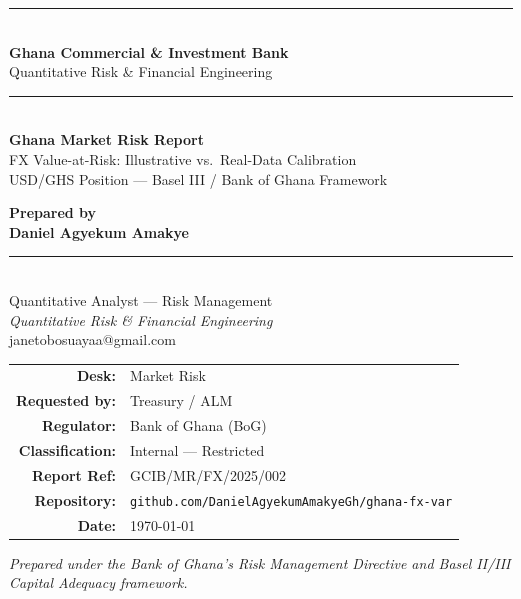 \documentclass[11pt,a4paper]{article}
\makeatletter
\newcommand{\authorname}{Daniel Agyekum Amakye}
\newcommand{\authortitle}{Quantitative Analyst --- Risk Management}
\newcommand{\authordesk}{Quantitative Risk \& Financial Engineering}
\newcommand{\authoremail}{janetobosuayaa@gmail.com}
\newcommand{\reporef}{github.com/DanielAgyekumAmakyeGh/ghana-fx-var}
\makeatother
\begin{document}
\begin{titlepage}
    \centering
    \vspace*{1.2cm}
    {\color{gcibblue}\rule{\textwidth}{1.5pt}}\\[0.4cm]
    {\Huge\bfseries\color{gcibblue} Ghana Commercial \& Investment Bank}\\[0.3cm]
    {\Large\color{gcibgold} Quantitative Risk \& Financial Engineering}\\[0.2cm]
    {\color{gcibblue}\rule{\textwidth}{1.5pt}}\\[1.2cm]

    {\Huge\bfseries Ghana Market Risk Report}\\[0.5cm]
    {\LARGE FX Value-at-Risk: Illustrative vs.\ Real-Data Calibration}\\[0.3cm]
    {\large USD/GHS Position --- Basel III / Bank of Ghana Framework}\\[1.4cm]

    \begin{tcolorbox}[
        width=0.82\textwidth,
        colback=codebg,
        colframe=gcibblue,
        boxrule=1pt, arc=3pt,
        left=14pt, right=14pt, top=10pt, bottom=10pt
    ]
        \centering
        {\large\bfseries\color{gcibblue} Prepared by}\\[0.35cm]
        {\Large\bfseries \authorname}\\[0.25cm]
        {\color{gcibgold}\rule{6cm}{0.6pt}}\\[0.25cm]
        {\large \authortitle}\\[0.15cm]
        {\itshape \authordesk}\\[0.35cm]
        {\small \authoremail}
    \end{tcolorbox}

    \vspace{1.0cm}

    \begin{tabular}{rl}
        \textbf{Desk:}          & Market Risk \\[0.2cm]
        \textbf{Requested by:}  & Treasury / ALM \\[0.2cm]
        \textbf{Regulator:}     & Bank of Ghana (BoG) \\[0.2cm]
        \textbf{Classification:} & Internal --- Restricted \\[0.2cm]
        \textbf{Report Ref:}    & GCIB/MR/FX/2025/002 \\[0.2cm]
        \textbf{Repository:}    & \texttt{\reporef} \\[0.2cm]
        \textbf{Date:}          & \today \\
    \end{tabular}

    \vfill
    {\small\itshape Prepared under the Bank of Ghana's Risk Management Directive and Basel II/III Capital Adequacy framework.}
\end{titlepage}
\end{document}
